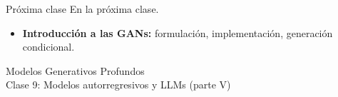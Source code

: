 \documentclass{beamer}
\begin{document}
\begin{frame}{Próxima clase}
    En la próxima clase.
    \begin{itemize}
        \item \textbf{Introducción a las GANs:} formulación, implementación, generación condicional.
    \end{itemize}
\end{frame}

\begin{frame}
    \centering
    \Large{Modelos Generativos Profundos}\\
    \large{Clase 9: Modelos autorregresivos y LLMs (parte V)}
\end{frame}
\end{document}
